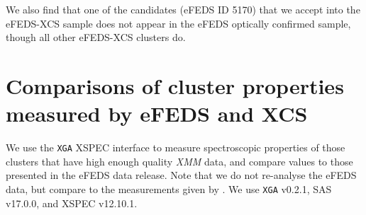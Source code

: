 \documentclass[fleqn,usenatbib]{mnras}
\begin{document}
We also find that one of the candidates (eFEDS ID 5170) that we accept into the eFEDS-XCS sample does not appear in the eFEDS optically confirmed sample, though all other eFEDS-XCS clusters do. 



\section{Comparisons of cluster properties measured by \lowercase{e}FEDS and XCS}
\label{sec:meascomp}

We use the \texttt{XGA} XSPEC \citep[][]{xspec} interface to measure spectroscopic properties of those clusters that have high enough quality {\em XMM} data, and compare values to those presented in the eFEDS data release. Note that we do not re-analyse the eFEDS data, but compare to the measurements given by \cite{efedsclustercat}. We use \texttt{XGA} v0.2.1, SAS v17.0.0, and XSPEC v12.10.1.
\end{document}
